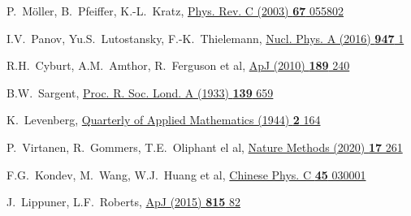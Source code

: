 \begin{thebibliography}{9}
P.~M\"oller, B.~Pfeiffer, K.-L.~Kratz,
\href{https://link.aps.org/doi/10.1103/PhysRevC.67.055802}
  {Phys. Rev. C (2003) \textbf{67} 055802}

I.V.~Panov, Yu.S.~Lutostansky, F.-K.~Thielemann,
\href{hhttps://doi.org/10.1016/j.nuclphysa.2015.12.001}
  {Nucl. Phys. A (2016) \textbf{947} 1}

R.H.~Cyburt, A.M.~Amthor, R.~Ferguson et al,
\href{https://doi.org/10.1088/0067-0049/189/1/240}
  {ApJ (2010) \textbf{189} 240}

B.W.~Sargent,
\href{https://doi.org/10.1098/rspa.1933.0045}
  {Proc. R. Soc. Lond. A (1933) \textbf{139} 659}

K.~Levenberg,
\href{https://doi.org/10.1090/qam/10666}
  {Quarterly of Applied Mathematics (1944) \textbf{2} 164}

P.~Virtanen, R.~Gommers, T.E.~Oliphant el al,
\href{https://doi.org/10.1038/s41592-019-0686-2}
  {Nature Methods (2020) \textbf{17} 261}

 F.G.~Kondev, M.~Wang, W.J.~Huang et al,
 \href{https://doi.org/10.1088/1674-1137/abddae}
  {Chinese Phys. C \textbf{45} 030001}

J.~Lippuner, L.F.~Roberts, 
\href{http://dx.doi.org/10.1088/0004-637X/815/2/82}
  {ApJ (2015) \textbf{815} 82}

\end{thebibliography}
